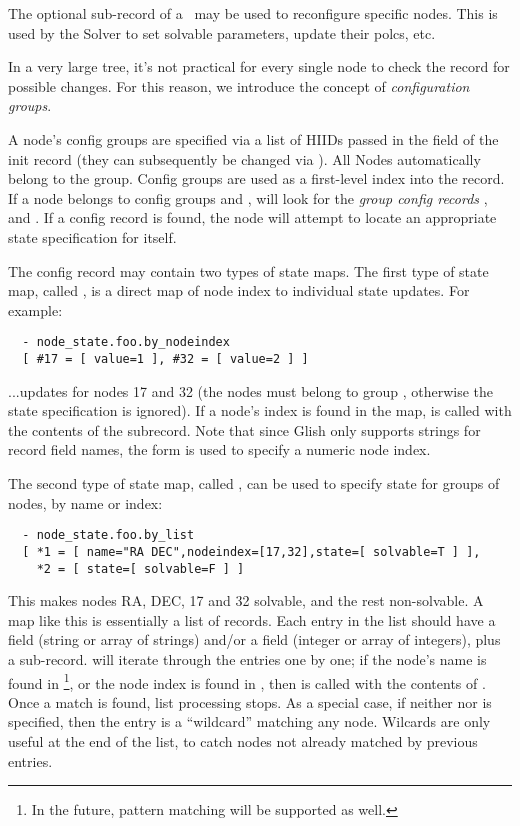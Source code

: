 \documentclass[10pt]{article}
\begin{document}
  The optional  sub-record of a \Request\ may be used to
  reconfigure specific nodes. This is used by the Solver to set solvable
  parameters, update their polcs, etc. 

  In a very large tree, it's not practical for every single node to check the
  record for possible changes. For this reason, we introduce the concept of
  {\em configuration groups}. 

  A node's config groups are specified via a list of HIIDs passed in the
   field of the init record (they can subsequently be
  changed via ). All Nodes automatically belong to the 
  group. Config groups are used as a first-level index into the
   record. If a node belongs to config groups  and
  ,  will look for the {\em group config records}\/
  ,  and . If a
  config record is found, the node will attempt to locate an appropriate state
  specification for itself.

  The config record may contain two types of state maps. The first type of
  state map, called , is a direct map of node index to
  individual state updates. For example: 

\begin{verbatim}
  - node_state.foo.by_nodeindex
  [ #17 = [ value=1 ], #32 = [ value=2 ] ]
\end{verbatim}

  ...updates  for nodes 17 and 32 (the nodes must belong to
  group , otherwise the state specification is ignored). If a node's
  index is found in the map,  is called with the contents of the
  subrecord. Note that since Glish only supports strings for record field
  names, the  form is used to specify a numeric node index.

  The second type of state map, called , can be used to specify
  state for groups of nodes, by name or index:

\begin{verbatim}
  - node_state.foo.by_list
  [ *1 = [ name="RA DEC",nodeindex=[17,32],state=[ solvable=T ] ],
    *2 = [ state=[ solvable=F ] ]
\end{verbatim}

  This makes nodes RA, DEC, 17 and 32 solvable, and the rest non-solvable.  A
  map like this is essentially a list of records. Each entry in the list should
  have a  field (string or array of strings) and/or a 
  field (integer or array of integers), plus a  sub-record.
   will iterate through the entries one by one; if the
  node's name is found in \footnote{In the future, pattern matching
  will be supported as well.}, or the node index is found in ,
  then  is called with the contents of . Once a match
  is found, list processing stops. As a special case, if neither  nor
   is specified, then the entry is a ``wildcard'' matching any node.
  Wilcards are only useful at the end of the list, to catch nodes not already
  matched by previous entries.
  
\end{document}
